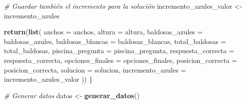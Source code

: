 \documentclass[
]{article}
\newenvironment{Shaded}{\begin{snugshade}}{\end{snugshade}}
\newcommand{\AttributeTok}[1]{\textcolor[rgb]{0.13,0.29,0.53}{#1}}
\newcommand{\CommentTok}[1]{\textcolor[rgb]{0.56,0.35,0.01}{\textit{#1}}}
\newcommand{\FunctionTok}[1]{\textcolor[rgb]{0.13,0.29,0.53}{\textbf{#1}}}
\newcommand{\NormalTok}[1]{#1}
\newcommand{\OtherTok}[1]{\textcolor[rgb]{0.56,0.35,0.01}{#1}}
\begin{document}
\begin{Shaded}
\begin{Highlighting}[]
  \CommentTok{\# Guardar también el incremento para la solución}
\NormalTok{  incremento\_azules\_valor }\OtherTok{\textless{}{-}}\NormalTok{ incremento\_azules}
  
  \FunctionTok{return}\NormalTok{(}\FunctionTok{list}\NormalTok{(}
    \AttributeTok{anchos =}\NormalTok{ anchos,}
    \AttributeTok{altura =}\NormalTok{ altura,}
    \AttributeTok{baldosas\_azules =}\NormalTok{ baldosas\_azules,}
    \AttributeTok{baldosas\_blancas =}\NormalTok{ baldosas\_blancas,}
    \AttributeTok{total\_baldosas =}\NormalTok{ total\_baldosas,}
    \AttributeTok{piscina\_pregunta =}\NormalTok{ piscina\_pregunta,}
    \AttributeTok{respuesta\_correcta =}\NormalTok{ respuesta\_correcta,}
    \AttributeTok{opciones\_finales =}\NormalTok{ opciones\_finales,}
    \AttributeTok{posicion\_correcta =}\NormalTok{ posicion\_correcta,}
    \AttributeTok{solucion =}\NormalTok{ solucion,}
    \AttributeTok{incremento\_azules =}\NormalTok{ incremento\_azules\_valor}
\NormalTok{  ))}
\NormalTok{\}}

\CommentTok{\# Generar datos}
\NormalTok{datos }\OtherTok{\textless{}{-}} \FunctionTok{generar\_datos}\NormalTok{()}
\end{Highlighting}
\end{Shaded}
\end{document}
